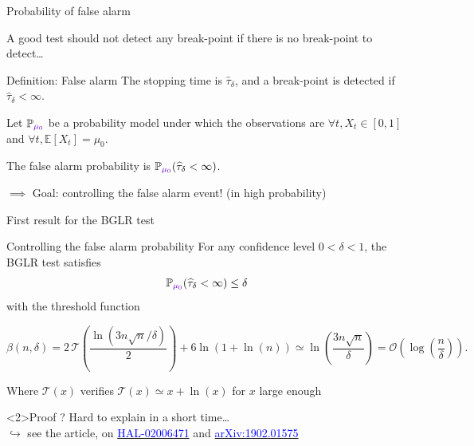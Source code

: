 \documentclass[11pt,english,ignorenonframetext,]{beamer}
\begin{document}
\begin{frame}{Probability of false alarm}

  A good test should not detect any break-point if there is no break-point to detect\ldots

  \pause
  \begin{block}{Definition: False alarm}
    The stopping time is $\widehat{\tau}_\delta$,
    and a break-point is detected if $\widehat{\tau}_\delta < \infty$.

    Let $\mathbb{P}_{\textcolor{deeppurple}{\mu_0}}$ be a probability model under which the observations are $\forall t, X_t \in[0,1]$
    and \textcolor{deeppurple}{$\forall t, \mathbb{E}[X_t] = \mu_0$}.

    The \alert{false alarm probability} is $\mathbb{P}_{\textcolor{deeppurple}{\mu_0}}(\widehat{\tau}_\delta < \infty)$.
  \end{block}

  \alert{$\implies$ Goal: controlling the false alarm event!} (in high probability)

\end{frame}

\begin{frame}{First result for the BGLR test \dSmiley{}}

  \begin{block}{Controlling the false alarm probability}
    For any \alert{confidence level} $0<\delta<1$,
    the BGLR test satisfies
    \[ \mathbb{P}_{\textcolor{deeppurple}{\mu_0}}(\widehat{\tau}_\delta < \infty) \leq \delta \]
    with the threshold function
    \begin{small}
      \[ \beta(n,\delta)= 2\,\mathcal{T}\left(\frac{\ln(3n\sqrt{n}/\delta)}{2}\right) + 6\ln(1+\ln(n)) \simeq \ln\left(\frac{3n \sqrt{n}}{\delta}\right) = \mathcal{O}\left(\log\left(\frac{n}{\delta}\right)\right).\]
    \end{small}
    \begin{footnotesize}
      Where $\mathcal{T}(x)$ verifies $\mathcal{T}(x)\simeq x + \ln(x)$ for $x$ large enough
    \end{footnotesize}
  \end{block}


  \begin{exampleblock}<2>{Proof ?}
    Hard to explain in a short time\ldots\\
    $\hookrightarrow$ see the article, on
    \href{https://hal.inria.fr/hal-02006471}{\textcolor{blue}{HAL-02006471}}
    and
    \href{https://arxiv.org/abs/1902.01575}{\textcolor{blue}{arXiv:1902.01575}}
  \end{exampleblock}

\end{frame}
\end{document}
